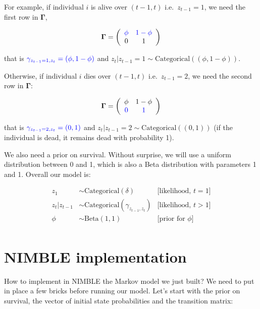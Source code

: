 \documentclass[
  12pt,
]{krantz}
\begin{document}
For example, if individual \(i\) is alive over \((t-1,t)\) i.e.~\(z_{t-1} = 1\), we need the first row in \(\mathbf{\Gamma}\),

\begin{align*}
\mathbf{\Gamma} =
\left(\begin{array}{cc}
\color{blue}{\phi} & \color{blue}{1 - \phi}\\
0 & 1
\end{array}\right)
\end{align*}

that is \(\color{blue}{\gamma_{z_{t-1} = 1,z_{t}} = (\phi, 1-\phi)}\) and \(z_t | z_{t-1} = 1 \sim \text{Categorical}((\phi, 1-\phi))\).

Otherwise, if individual \(i\) dies over \((t-1,t)\) i.e.~\(z_{t-1} = 2\), we need the second row in \(\mathbf{\Gamma}\):

\begin{align*}
\mathbf{\Gamma} =
\left(\begin{array}{cc}
\phi & 1 - \phi\\
\color{blue}{0} & \color{blue}{1}
\end{array}\right)
\end{align*}

that is \(\color{blue}{\gamma_{z_{t-1} = 2,z_{t}} = (0, 1)}\) and \(z_t | z_{t-1} = 2 \sim \text{Categorical}((0, 1))\) (if the individual is dead, it remains dead with probability 1).

We also need a prior on survival. Without surprise, we will use a uniform distribution between 0 and 1, which is also a Beta distribution with parameters 1 and 1. Overall our model is:

\begin{align*}
   z_1 &\sim \text{Categorical}(\delta) &\text{[likelihood, }t = 1 \text{]}\\
   z_t | z_{t-1} &\sim \text{Categorical}(\gamma_{z_{t-1},z_{t}}) &\text{[likelihood, }t > 1 \text{]}\\
  \phi &\sim \text{Beta}(1, 1) &\text{[prior for }\phi \text{]} \\
\end{align*}

\hypertarget{nimble-implementation}{%
\section{NIMBLE implementation}\label{nimble-implementation}}

How to implement in NIMBLE the Markov model we just built? We need to put in place a few bricks before running our model. Let's start with the prior on survival, the vector of initial state probabilities and the transition matrix:
\end{document}
